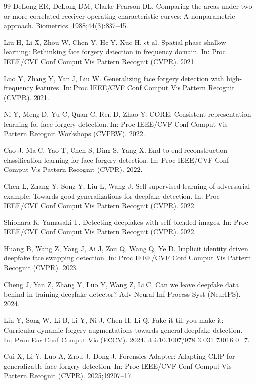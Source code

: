 \documentclass[fonts]{icst}
\begin{document}
\begin{thebibliography}{99}
DeLong ER, DeLong DM, Clarke-Pearson DL.
Comparing the areas under two or more correlated receiver operating characteristic curves: A nonparametric approach.
Biometrics. 1988;44(3):837--45.

Liu H, Li X, Zhou W, Chen Y, He Y, Xue H, et al.
Spatial-phase shallow learning: Rethinking face forgery detection in frequency domain.
In: Proc IEEE/CVF Conf Comput Vis Pattern Recognit (CVPR). 2021.

Luo Y, Zhang Y, Yan J, Liu W.
Generalizing face forgery detection with high-frequency features.
In: Proc IEEE/CVF Conf Comput Vis Pattern Recognit (CVPR). 2021.

Ni Y, Meng D, Yu C, Quan C, Ren D, Zhao Y.
CORE: Consistent representation learning for face forgery detection.
In: Proc IEEE/CVF Conf Comput Vis Pattern Recognit Workshops (CVPRW). 2022.

Cao J, Ma C, Yao T, Chen S, Ding S, Yang X.
End-to-end reconstruction-classification learning for face forgery detection.
In: Proc IEEE/CVF Conf Comput Vis Pattern Recognit (CVPR). 2022.

Chen L, Zhang Y, Song Y, Liu L, Wang J.
Self-supervised learning of adversarial example: Towards good generalizations for deepfake detection.
In: Proc IEEE/CVF Conf Comput Vis Pattern Recognit (CVPR). 2022.

Shiohara K, Yamasaki T.
Detecting deepfakes with self-blended images.
In: Proc IEEE/CVF Conf Comput Vis Pattern Recognit (CVPR). 2022.

Huang B, Wang Z, Yang J, Ai J, Zou Q, Wang Q, Ye D.
Implicit identity driven deepfake face swapping detection.
In: Proc IEEE/CVF Conf Comput Vis Pattern Recognit (CVPR). 2023.

Cheng J, Yan Z, Zhang Y, Luo Y, Wang Z, Li C.
Can we leave deepfake data behind in training deepfake detector?
Adv Neural Inf Process Syst (NeurIPS). 2024.

Lin Y, Song W, Li B, Li Y, Ni J, Chen H, Li Q.
Fake it till you make it: Curricular dynamic forgery augmentations towards general deepfake detection.
In: Proc Eur Conf Comput Vis (ECCV). 2024. doi:10.1007/978-3-031-73016-0\_7.

Cui X, Li Y, Luo A, Zhou J, Dong J.
Forensics Adapter: Adapting CLIP for generalizable face forgery detection.
In: Proc IEEE/CVF Conf Comput Vis Pattern Recognit (CVPR). 2025;19207--17.


\end{thebibliography}
\end{document}
